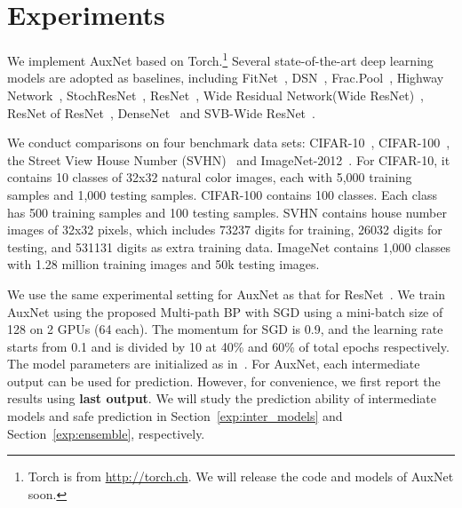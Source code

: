 \documentclass[10pt,onecolumn,letterpaper]{article}
\def\SexyName{AuxNet\xspace}
\begin{document}
\section{Experiments}\label{sec:exp}
We implement \SexyName based on Torch.\footnote{Torch is from \url{http://torch.ch}. We will release the code and models of \SexyName soon.}
Several state-of-the-art deep learning models are adopted as baselines, including FitNet~\cite{romero2014fitnets},
DSN~\cite{Lee2015}, Frac.Pool~\cite{graham2014fractional}, Highway Network~\cite{srivastava2015highway}, StochResNet~\cite{DBLP:journals/corr/HuangSLSW16}, ResNet~\cite{he2016identity}, Wide Residual Network(Wide ResNet)~\cite{zagoruyko2016wide}, ResNet of ResNet~\cite{zhang2016residual}, DenseNet~\cite{huang2016densely} and SVB-Wide ResNet~\cite{jia2016improving}.

We conduct comparisons on four benchmark data sets: CIFAR-10~\cite{krizhevsky2009learning}, CIFAR-100~\cite{krizhevsky2009learning}, the Street View House Number (SVHN)~\cite{netzer2011reading} and ImageNet-2012~\cite{russakovsky2015imagenet}.
For CIFAR-10, it contains 10 classes of 32x32 natural color images, each with 5,000 training samples
and 1,000 testing samples. CIFAR-100 contains 100 classes. Each class has 500 training samples and 100 testing samples.
SVHN contains house number images of 32x32 pixels, which includes 73237 digits for training, 26032 digits for testing, and 531131 digits as extra training data.
ImageNet contains 1,000 classes with 1.28 million training images and 50k testing images.
%

We use the same experimental setting for \SexyName as that for ResNet~\cite{he2015deep}. We train AuxNet using the proposed Multi-path BP with SGD using a mini-batch size of 128 on 2 GPUs (64 each). The momentum for SGD is 0.9, and the learning rate starts from 0.1 and is divided by 10 at 40\% and 60\% of total epochs respectively.  The model parameters are initialized as in~\cite{he2015delving}. For AuxNet, each intermediate output can be used for prediction. However, for convenience, we first report the results using \textbf{last output}. We will study the prediction ability of intermediate models and safe prediction in Section~\ref{exp:inter_models} and Section~\ref{exp:ensemble}, respectively.
\end{document}
